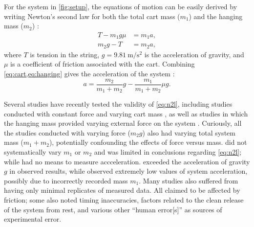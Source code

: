 \documentclass[reprint,amsmath,amssymb,aps,twoside]{revtex4-2}
\begin{document}
For the system in \cref{fig:setup}, the equations of motion can be easily derived by writing Newton's second law for both the total cart mass ($m_1$) and the hanging mass ($m_2$) \cite{tipler, barrons}:
\begin{align}
T - m_1 g \mu &= m_1 a, \label{eq:cart}\\
m_2 g - T &= m_2 a, \label{eq:hanging}
\end{align}
where $T$ is tension in the string, $g=\qty{9.81}{\meter\per\second\squared}$ is the acceleration of gravity, and $\mu$ is a coefficient of friction associated with the cart. Combining \cref{eq:cart,eq:hanging} gives the acceleration of the system \cite{tipler,barrons}:
\begin{equation}
a = \dfrac{m_2}{m_1+m_2} g - \dfrac{m_1}{m_1+m_2} \mu g.
\label{eq:fricdimensional}
\end{equation}

Several studies have recently tested the validity of \cref{eq:n2l}, including studies conducted with constant force and varying cart mass  \cite{arenas-2024-testing,avalur-2024-verifying,canada-2024-experimental,kishore-2024-relationship,yagnyeshwaran-2024-verifying}, as well as studies in which the hanging mass provided varying external force on the system \cite{govardhanen-2024-newtons,kedharnath-2024-examining,krasnopolsky-2024-testing}. Curiously, all the studies \cite{govardhanen-2024-newtons,kedharnath-2024-examining,krasnopolsky-2024-testing} conducted with varying force ($m_2g$) also had varying total system mass ($m_1+m_2$), potentially confounding the effects of force versus mass. \cite{perle-2024-experimental} did not systematically vary $m_1$ or $m_2$ and was limited in conclusions regarding \cref{eq:n2l}; while \cite{barone-2024-investigating} had no means to measure accceleration. \cite{krasnopolsky-2024-testing} exceeded the acceleration of gravity $g$ in observed results, while \cite{govardhanen-2024-newtons} observed extremely low values of system acceleration, possibly due to incorrectly recorded mass $m_1$. Many studies also suffered from having only minimal replicates of measured data. All \cite{arenas-2024-testing,avalur-2024-verifying,canada-2024-experimental,kishore-2024-relationship,yagnyeshwaran-2024-verifying,govardhanen-2024-newtons,kedharnath-2024-examining,krasnopolsky-2024-testing,perle-2024-experimental} claimed to be affected by friction; some also noted timing inaccuracies, factors related to the clean release of the system from rest, and various other ``human error[s]'' as sources of experimental error. 
\end{document}

